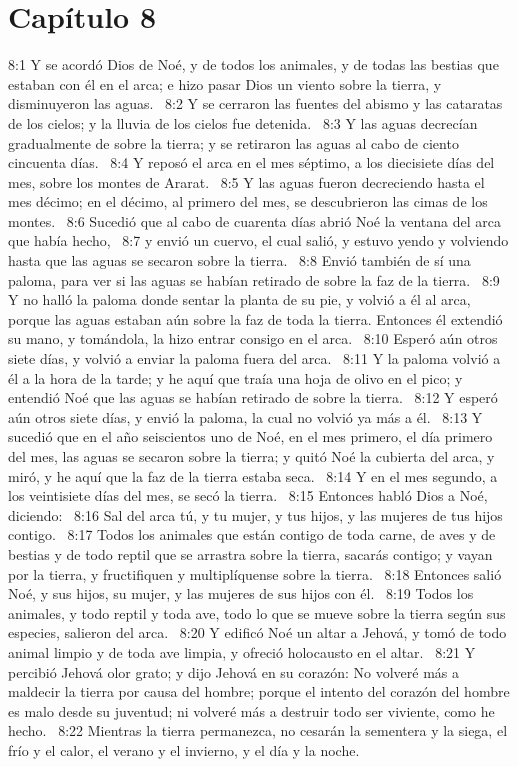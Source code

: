 \section*{Capítulo 8}

8:1 Y se acordó Dios de Noé, y de todos los animales, y de todas las bestias que estaban con él en el arca; e hizo pasar Dios un viento sobre la tierra, y disminuyeron las aguas.  
8:2 Y se cerraron las fuentes del abismo y las cataratas de los cielos; y la lluvia de los cielos fue detenida.  
8:3 Y las aguas decrecían gradualmente de sobre la tierra; y se retiraron las aguas al cabo de ciento cincuenta días.  
8:4 Y reposó el arca en el mes séptimo, a los diecisiete días del mes, sobre los montes de Ararat.  
8:5 Y las aguas fueron decreciendo hasta el mes décimo; en el décimo, al primero del mes, se descubrieron las cimas de los montes.  
8:6 Sucedió que al cabo de cuarenta días abrió Noé la ventana del arca que había hecho,  
8:7 y envió un cuervo, el cual salió, y estuvo yendo y volviendo hasta que las aguas se secaron sobre la tierra.  
8:8 Envió también de sí una paloma, para ver si las aguas se habían retirado de sobre la faz de la tierra.  
8:9 Y no halló la paloma donde sentar la planta de su pie, y volvió a él al arca, porque las aguas estaban aún sobre la faz de toda la tierra. Entonces él extendió su mano, y tomándola, la hizo entrar consigo en el arca.  
8:10 Esperó aún otros siete días, y volvió a enviar la paloma fuera del arca.  
8:11 Y la paloma volvió a él a la hora de la tarde; y he aquí que traía una hoja de olivo en el pico; y entendió Noé que las aguas se habían retirado de sobre la tierra.  
8:12 Y esperó aún otros siete días, y envió la paloma, la cual no volvió ya más a él.  
8:13 Y sucedió que en el año seiscientos uno de Noé, en el mes primero, el día primero del mes, las aguas se secaron sobre la tierra; y quitó Noé la cubierta del arca, y miró, y he aquí que la faz de la tierra estaba seca.  
8:14 Y en el mes segundo, a los veintisiete días del mes, se secó la tierra.  
8:15 Entonces habló Dios a Noé, diciendo:  
8:16 Sal del arca tú, y tu mujer, y tus hijos, y las mujeres de tus hijos contigo.  
8:17 Todos los animales que están contigo de toda carne, de aves y de bestias y de todo reptil que se arrastra sobre la tierra, sacarás contigo; y vayan por la tierra, y fructifiquen y multiplíquense sobre la tierra.  
8:18 Entonces salió Noé, y sus hijos, su mujer, y las mujeres de sus hijos con él.  
8:19 Todos los animales, y todo reptil y toda ave, todo lo que se mueve sobre la tierra según sus especies, salieron del arca.  
8:20 Y edificó Noé un altar a Jehová, y tomó de todo animal limpio y de toda ave limpia, y ofreció holocausto en el altar.  
8:21 Y percibió Jehová olor grato; y dijo Jehová en su corazón: No volveré más a maldecir la tierra por causa del hombre; porque el intento del corazón del hombre es malo desde su juventud; ni volveré más a destruir todo ser viviente, como he hecho.  
8:22 Mientras la tierra permanezca, no cesarán la sementera y la siega, el frío y el calor, el verano y el invierno, y el día y la noche.  

